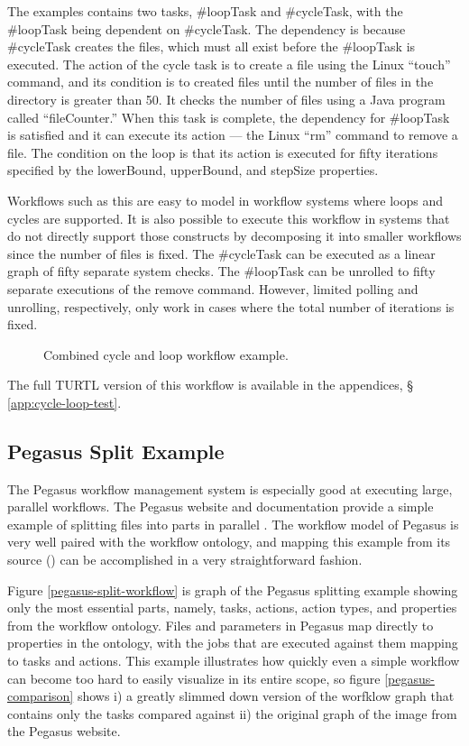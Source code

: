 The examples contains two tasks, \#loopTask and \#cycleTask, with the \#loopTask
being dependent on \#cycleTask. The dependency is because \#cycleTask
creates the files, which must all exist before the \#loopTask is executed. The
action of the cycle task is to create a file using the Linux ``touch'' command,
and its condition is to created files until the number of files in the directory
is greater than 50. It checks the number of files using a Java program called
``fileCounter.'' When this task is complete, the dependency for \#loopTask is
satisfied and it can execute its action --- the Linux ``rm'' command to remove a
file. The condition on the loop is that its action is executed for fifty
iterations specified by the lowerBound, upperBound, and stepSize properties.

Workflows such as this are easy to model in workflow systems where loops and
cycles are supported. It is also possible to execute this workflow in systems
that do not directly support those constructs by decomposing it into smaller
workflows since the number of files is fixed. The \#cycleTask can be
executed as a linear graph of fifty separate system checks. The \#loopTask can
be unrolled to fifty separate executions of the remove command. However, limited
polling and unrolling, respectively, only work in cases where the total number
of iterations is fixed.

\begin{figure}[htbp]
\centering
{}
\caption{Combined cycle and loop workflow example.}
\label{cycle-loop-test}
\end{figure}

The full TURTL version of this workflow is available in the appendices, \S
\ref{app:cycle-loop-test}.

\subsection{Pegasus Split Example}

The Pegasus workflow management system is especially good at executing large,
parallel workflows. The Pegasus website and documentation provide a simple
example of splitting files into parts in parallel \cite{}. The workflow model
of Pegasus is very well paired with the workflow ontology, and mapping this
example from its source (\cite{}) can be accomplished in a very straightforward
fashion.

Figure \ref{pegasus-split-workflow} is graph of the Pegasus splitting example
showing only the most essential parts, namely, tasks, actions, action types, and
properties from the workflow ontology. Files and parameters in Pegasus map
directly to properties in the ontology, with the jobs that are executed against
them mapping to tasks and actions. This example illustrates how quickly even a
simple workflow can become too hard to easily visualize in its entire scope, so
figure \ref{pegasus-comparison} shows i) a greatly slimmed down version of the
worfklow graph that contains only the tasks compared against ii) the original
graph of the image from the Pegasus website.

